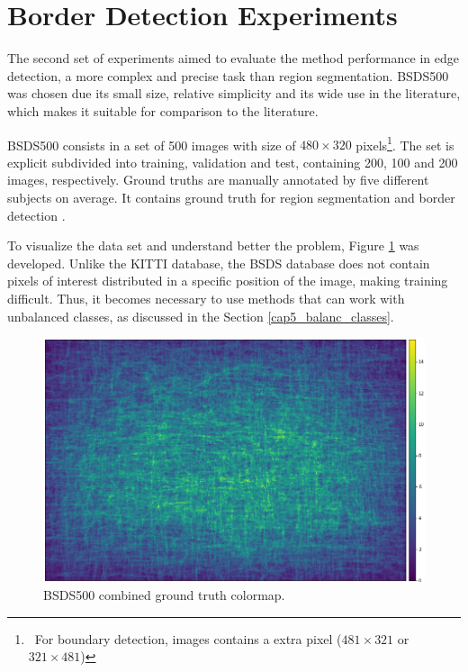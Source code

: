 \section{Border Detection Experiments}
\label{cap6_result_experm_2}

The second set of experiments aimed to evaluate the method performance  in edge detection, a more complex and precise task than region segmentation.
BSDS500 was chosen due its small size, relative simplicity and its wide use in the literature, which makes it suitable for comparison to the literature.

BSDS500 consists in a set of 500 images with size of $480 \times 320$ pixels\footnote{~For boundary detection, images contains a extra pixel ($481 \times 321$ or $321 \times 481$)}.
The set is explicit subdivided into training, validation and test, containing 200, 100 and 200 images, respectively.
Ground truths are manually annotated by five different subjects on average. 
It contains ground truth for region segmentation and border detection \cite{amfm_pami2011}.

{\color{red}
To visualize the data set and understand better the problem, Figure \ref{fig:bsds_colormap} was developed.
Unlike the KITTI database, the BSDS database does not contain pixels of interest distributed in a specific position of the image, making training difficult.
Thus, it becomes necessary to use methods that can work with unbalanced classes, as discussed in the Section \ref{cap5_balanc_classes}.
}

\begin{figure}%
  \centering
  \includegraphics[width=1\columnwidth]{../imagens/visualiz_dados/bsds_colormap.png}
  \caption{BSDS500 combined ground truth colormap.}
  \label{fig:bsds_colormap}
\end{figure}

